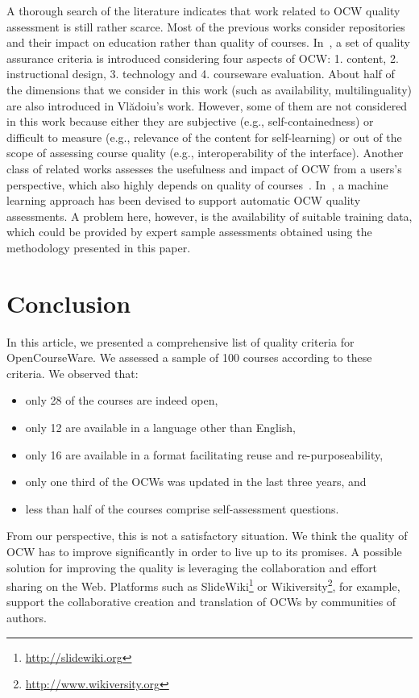 \documentclass{sig-alternate}
\theoremstyle{definition}
\begin{document}
A thorough search of the literature indicates that work related to OCW quality assessment is still rather scarce.
Most of the previous works consider repositories and their impact on education rather than quality of courses.
In~\parencite{Vladoiu.2014a}, a set of quality assurance criteria is introduced considering four aspects of OCW: 1. content, 2. instructional design, 3. technology and 4. courseware evaluation.
About half of the dimensions that we consider in this work (such as availability, multilinguality) are also introduced in Vl{\u a}doiu's work.
However, some of them are not considered in this work because either they are subjective (e.g., self-containedness) or difficult to measure (e.g., relevance of the content for self-learning) or out of the scope of assessing course quality (e.g., interoperability of the interface).
Another class of related works assesses the usefulness and impact of OCW from a users's perspective, which also highly depends on quality of courses~\parencite{Chang.2014,Olufunke.2014}.
In~\parencite{Moise.2014}, a machine learning approach has been devised to support automatic OCW quality assessments.
A problem here, however, is the availability of suitable training data, which could be provided by expert sample assessments obtained using the methodology presented in this paper.

\noindent\section{Conclusion}
\label{sec:Con-Recom}

In this article, we presented a comprehensive list of quality criteria for OpenCourseWare.
We assessed a sample of 100 courses according to these criteria.
We observed that:
\begin{itemize}
\item only 28 of the courses are indeed open,
\item only 12 are available in a language other than English,
\item only 16 are available in a format facilitating reuse and re-purposeability,
\item only one third of the OCWs was updated in the last three years, and
\item less than half of the courses comprise self-assessment questions.
\end{itemize}
From our perspective, this is not a satisfactory situation.
We think the quality of OCW has to improve significantly in order to live up to its promises.
A possible solution for improving the quality is leveraging the collaboration and effort sharing on the Web.
Platforms such as SlideWiki\footnote{\url{http://slidewiki.org}} or Wikiversity\footnote{\url{http://www.wikiversity.org}}, for example, support the collaborative creation and translation of OCWs by communities of authors.
\end{document}
